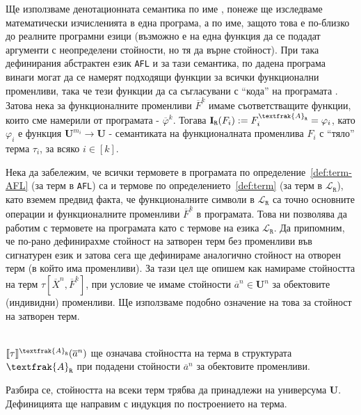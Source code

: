 \documentclass[12pt,twoside,a4paper]{article}
\begin{document}
	Ще използваме денотационната семантика по име \cite{sep}, понеже ще изследваме математически изчисленията в една програма, а по име, защото това е по-близко до реалните програмни езици (възможно е на една функция да се подадат аргументи с неопределени стойности, но тя да върне стойност). При така дефинирания абстрактен език \texttt{AFL} и за тази семантика, по дадена програма винаги могат да се намерят подходящи функции за всички функционални променливи, така че тези функции да са съгласувани с "`кода"' на програмата \cite{sep}. Затова нека за функционалните променливи $\overline{F}^k$ имаме съответстващите функции, които сме намерили от програмата - $\overline{\varphi}^k$. Тогава $\mathbf{I}_\texttt{R}(F_i) := F_i^{\textfrak{A}_\texttt{R}} = \varphi_i$, като $\varphi_i$ е функция $\mathbf{U}^{m_i} \to \mathbf{U}$ - семантиката на функционалната променлива $F_i$ с "`тяло"' терма $\tau_i$, за всяко $i \in [k]$.
	
	Нека да забележим, че всички термовете в програмата по определение~\ref{def:term-AFL} (за терм в \texttt{AFL}) са и термове по определението~\ref{def:term} (за терм в $\mathcal{L}_\texttt{R}$), като вземем предвид факта, че функционалните символи в $\mathcal{L}_\texttt{R}$ са точно основните операции и функционалните променливи $\overline{F}^k$ в програмата. Това ни позволява да работим с термовете на програмата като с термове на езика $\mathcal{L}_\texttt{R}$. Да припомним, че по-рано дефинирахме стойност на затворен терм без променливи във сигнатурен език и затова сега ще дефинираме аналогично стойност на отворен терм (в който има променливи). За тази цел ще опишем как намираме стойността на терм $\tau[\overline{X}^n,\overline{F}^k]$, при условие че имаме стойности $\overline{a}^n \in \mathbf{U}^n$ за обектовите (индивидни) променливи. Ще използваме подобно означение на това за стойност на затворен терм.
	\begin{denotation}~\\
		\indent $\llbracket\tau\rrbracket^{\textfrak{A}_\texttt{R}}(\overline{a}^n)$ ще означава стойността на терма в структурата $\textfrak{A}_\texttt{R}$ при подадени стойности $\overline{a}^n$ за обектовите променливи.
	\end{denotation}
	Разбира се, стойността на всеки терм трябва да принадлежи на универсума $\mathbf{U}$. Дефиницията ще направим с индукция по построението на терма.
	
\end{document}
